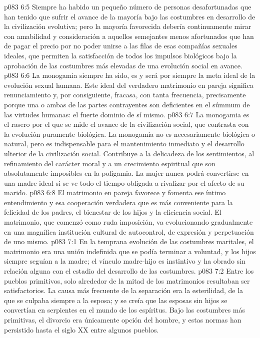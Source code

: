 \vs p083 6:5 Siempre ha habido un pequeño número de personas desafortunadas que han tenido que sufrir el avance de la mayoría bajo las costumbres en desarrollo de la civilización evolutiva; pero la mayoría favorecida debería continuamente mirar con amabilidad y consideración a aquellos semejantes menos afortunados que han de pagar el precio por no poder unirse a las filas de esas compañías sexuales ideales, que permiten la satisfacción de todos los impulsos biológicos bajo la aprobación de las costumbres más elevadas de una evolución social en avance.
\vs p083 6:6 \pc La monogamia siempre ha sido, es y será por siempre la meta ideal de la evolución sexual humana. Este ideal del verdadero matrimonio en pareja significa renunciamiento y, por consiguiente, fracasa, con tanta frecuencia, precisamente porque una o ambas de las partes contrayentes son deficientes en el súmmum de las virtudes humanas: el fuerte dominio de sí mismo.
\vs p083 6:7 La monogamia es el rasero por el que se mide el avance de la civilización social, que contrasta con la evolución puramente biológica. La monogamia no es necesariamente biológica o natural, pero es indispensable para el mantenimiento inmediato y el desarrollo ulterior de la civilización social. Contribuye a la delicadeza de los sentimientos, al refinamiento del carácter moral y a un crecimiento espiritual que son absolutamente imposibles en la poligamia. La mujer nunca podrá convertirse en una madre ideal si se ve todo el tiempo obligada a rivalizar por el afecto de su marido.
\vs p083 6:8 El matrimonio en pareja favorece y fomenta ese íntimo entendimiento y esa cooperación verdadera que es más conveniente para la felicidad de los padres, el bienestar de los hijos y la eficiencia social. El matrimonio, que comenzó como ruda imposición, va evolucionando gradualmente en una magnífica institución cultural de autocontrol, de expresión y perpetuación de uno mismo.
\vs p083 7:1 En la temprana evolución de las costumbres maritales, el matrimonio era una unión indefinida que se podía terminar a voluntad, y los hijos siempre seguían a la madre; el vínculo madre\hyp{}hijo es instintivo y ha obrado sin relación alguna con el estadio del desarrollo de las costumbres.
\vs p083 7:2 Entre los pueblos primitivos, solo alrededor de la mitad de los matrimonios resultaban ser satisfactorios. La causa más frecuente de la separación era la esterilidad, de la que se culpaba siempre a la esposa; y se creía que las esposas sin hijos se convertían en serpientes en el mundo de los espíritus. Bajo las costumbres más primitivas, el divorcio era únicamente opción del hombre, y estas normas han persistido hasta el siglo XX entre algunos pueblos.
